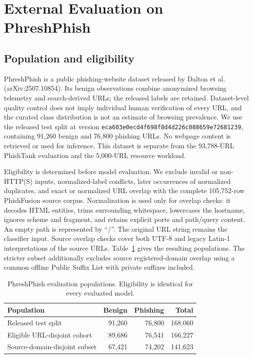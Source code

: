 \documentclass[10pt]{article}
\newenvironment{bluechange}{\color{black}}{}
\begin{document}
\clearpage
\section{\color{black}External Evaluation on PhreshPhish}
\label{sec:phreshphish}
\begin{bluechange}
\subsection{Population and eligibility}
PhreshPhish is a public phishing-website dataset released by Dalton et al. (arXiv:2507.10854). Its benign observations combine anonymized browsing telemetry and search-derived URLs; the released labels are retained. Dataset-level quality control does not imply individual human verification of every URL, and the curated class distribution is not an estimate of browsing prevalence. We use the released test split at version \texttt{eca603e0ecd4f698f8d4d226c088659e72681239}, containing 91,260 benign and 76,800 phishing URLs. No webpage content is retrieved or used for inference. This dataset is separate from the 93,788-URL PhishTank evaluation and the 5,000-URL resource workload.

Eligibility is determined before model evaluation. We exclude invalid or non-HTTP(S) inputs, normalized-label conflicts, later occurrences of normalized duplicates, and exact or normalized URL overlap with the complete 105,752-row PhishFusion source corpus. Normalization is used only for overlap checks: it decodes HTML entities, trims surrounding whitespace, lowercases the hostname, ignores scheme and fragment, and retains explicit ports and path/query content. An empty path is represented by ``/''. The original URL string remains the classifier input. Source overlap checks cover both UTF-8 and legacy Latin-1 interpretations of the source URLs. Table~\ref{tab:phresh_accounting} gives the resulting populations. The stricter subset additionally excludes source registered-domain overlap using a common offline Public Suffix List with private suffixes included.

\begin{table}[!ht]
\centering\small\color{black}
\caption{\color{black}PhreshPhish evaluation populations. Eligibility is identical for every evaluated model.}
\label{tab:phresh_accounting}
\begin{tabular}{lrrr}
\toprule
Population & Benign & Phishing & Total \\
\midrule
Released test split & 91,260 & 76,800 & 168,060 \\
Eligible URL-disjoint cohort & 89,686 & 76,541 & 166,227 \\
Source-domain-disjoint subset & 67,421 & 74,202 & 141,623 \\
\bottomrule
\end{tabular}
\end{table}


\end{bluechange}
\end{document}
